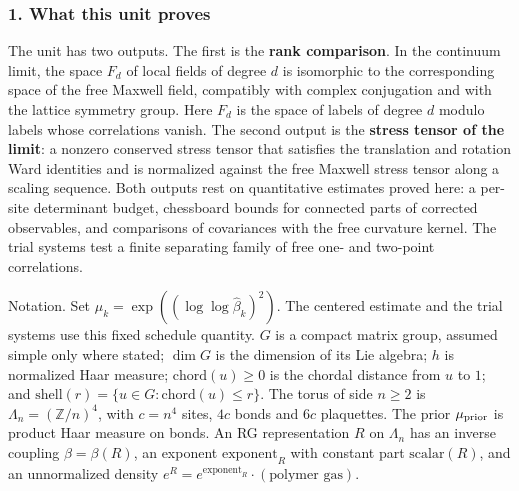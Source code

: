 \documentclass[
  letterpaper,
  11pt]{article}
\begin{document}
\subsubsection{1. What this unit proves}\label{what-this-unit-proves-13}

The unit has two outputs. The first is the \textbf{rank comparison}. In
the continuum limit, the space \(F_d\) of local fields of degree \(d\)
is isomorphic to the corresponding space of the free Maxwell field,
compatibly with complex conjugation and with the lattice symmetry group.
Here \(F_d\) is the space of labels of degree \(d\) modulo labels whose
correlations vanish. The second output is the \textbf{stress tensor of
the limit}: a nonzero conserved stress tensor that satisfies the
translation and rotation Ward identities and is normalized against the
free Maxwell stress tensor along a scaling sequence. Both outputs rest
on quantitative estimates proved here: a per-site determinant budget,
chessboard bounds for connected parts of corrected observables, and
comparisons of covariances with the free curvature kernel. The trial
systems test a finite separating family of free one- and two-point
correlations.

Notation. Set \(\mu_k=\exp((\log\log\hat\beta_k)^2)\). The centered
estimate and the trial systems use this fixed schedule quantity. \(G\)
is a compact matrix group, assumed simple only where stated; \(\dim G\)
is the dimension of its Lie algebra; \(h\) is normalized Haar measure;
\(\mathrm{chord}(u)\ge0\) is the chordal distance from \(u\) to \(1\);
and \(\mathrm{shell}(r)=\{u\in G:\mathrm{chord}(u)\le r\}\). The torus
of side \(n\ge2\) is \(\Lambda_n=(\mathbb Z/n)^4\), with \(c=n^4\)
sites, \(4c\) bonds and \(6c\) plaquettes. The prior \(\mu_{\rm prior}\)
is product Haar measure on bonds. An RG representation \(R\) on
\(\Lambda_n\) has an inverse coupling \(\beta=\beta(R)\), an exponent
\(\mathrm{exponent}_R\) with constant part \(\mathrm{scalar}(R)\), and
an unnormalized density
\(e^{R}=e^{\mathrm{exponent}_R}\cdot(\text{polymer gas})\).
\end{document}
